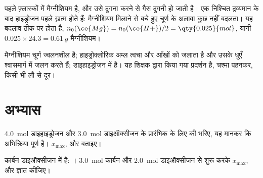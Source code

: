 \begin{remark}[पठार को पढ़ना]\label{rem:g10:reaction-progress-table:plateau}
पहले फ़्लास्कों में मैग्नीशियम  है, और उसे दुगना करने से गैस दुगनी
हो जाती है। एक निश्चित द्रव्यमान के बाद हाइड्रोजन  पहले ख़त्म होते हैं:
मैग्नीशियम मिलाने से बचे हुए चूर्ण के अलावा कुछ नहीं बदलता। यह बदलाव ठीक
 पर होता है,
$n_0(\ce{Mg}) = n_0(\ce{H+})/2 = \qty{0.025}{mol}$, यानी
$0.025 \times 24.3 = \qty{0.61}{g}$ मैग्नीशियम।
\end{remark}

\begin{safety}{}
मैग्नीशियम चूर्ण ज्वलनशील है; हाइड्रोक्लोरिक अम्ल त्वचा और आँखों को जलाता है
और उसके धुएँ श्वासमार्ग में जलन करते हैं; डाइहाइड्रोजन  में  है। यह
शिक्षक द्वारा किया गया प्रदर्शन है, चश्मा पहनकर, किसी भी लौ से दूर।
\end{safety}

\section{अभ्यास}

\begin{exercise}[$\star$]\label{exo:g10:reaction-progress-table:1}
\qty{4.0}{mol} डाइहाइड्रोजन और \qty{3.0}{mol} डाइऑक्सीजन के प्रारंभिक  के
लिए  की  भरिए, यह मानकर कि
अभिक्रिया पूर्ण है। $x_{\max}$,  और
 बताइए।
\end{exercise}

\begin{exercise}[$\star$]\label{exo:g10:reaction-progress-table:2}
कार्बन डाइऑक्सीजन में  है: । \qty{3.0}{mol}
कार्बन और \qty{2.0}{mol} डाइऑक्सीजन से शुरू करके $x_{\max}$,  और  ज्ञात कीजिए।
\end{exercise}

